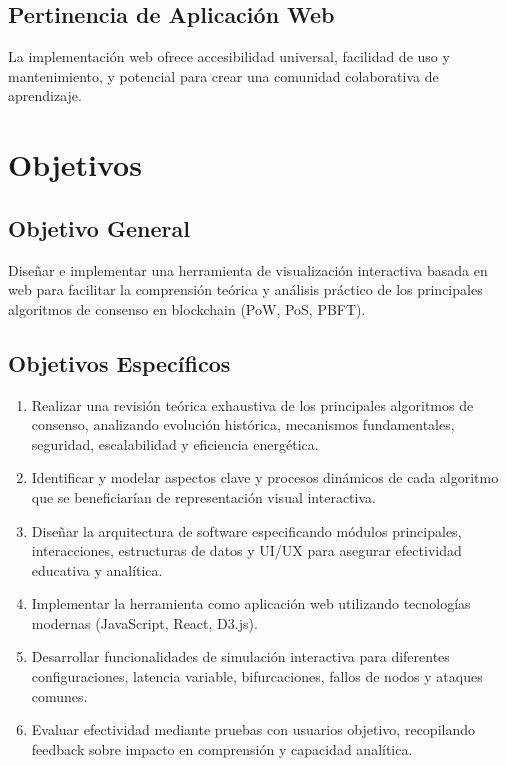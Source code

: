 \documentclass[spanish,12pt,letterpaper]{report}
\begin{document}
\subsection{Pertinencia de Aplicación Web}
La implementación web ofrece accesibilidad universal, facilidad de uso y mantenimiento, y potencial para crear una comunidad colaborativa de aprendizaje.

\section{Objetivos}
\subsection{Objetivo General}
Diseñar e implementar una herramienta de visualización interactiva basada en web para facilitar la comprensión teórica y análisis práctico de los principales algoritmos de consenso en blockchain (PoW, PoS, PBFT).

\subsection{Objetivos Específicos}
\begin{enumerate}
    \item Realizar una revisión teórica exhaustiva de los principales algoritmos de consenso, analizando evolución histórica, mecanismos fundamentales, seguridad, escalabilidad y eficiencia energética.
    
    \item Identificar y modelar aspectos clave y procesos dinámicos de cada algoritmo que se beneficiarían de representación visual interactiva.
    
    \item Diseñar la arquitectura de software especificando módulos principales, interacciones, estructuras de datos y UI/UX para asegurar efectividad educativa y analítica.
    
    \item Implementar la herramienta como aplicación web utilizando tecnologías modernas (JavaScript, React, D3.js).
    
    \item Desarrollar funcionalidades de simulación interactiva para diferentes configuraciones, latencia variable, bifurcaciones, fallos de nodos y ataques comunes.
    
    \item Evaluar efectividad mediante pruebas con usuarios objetivo, recopilando feedback sobre impacto en comprensión y capacidad analítica.
\end{enumerate}
\end{document}
